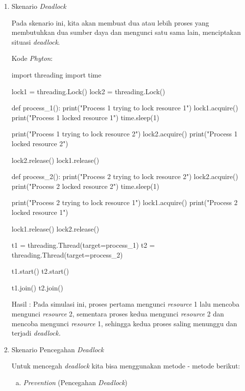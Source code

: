 \documentclass[12pt]{article}
\begin{document}
\begin{enumerate}
    \item Skenario \textit{Deadlock}

    Pada skenario ini, kita akan membuat dua atau lebih proses yang membutuhkan dua sumber daya dan mengunci satu sama lain, menciptakan situasi \textit{deadlock}.


    Kode \textit{Phyton}:

    \begin{python}
import threading
import time

lock1 = threading.Lock()
lock2 = threading.Lock()

def process_1():
    print("Process 1 trying to lock resource 1")
    lock1.acquire()
    print("Process 1 locked resource 1")
    time.sleep(1)
    
    print("Process 1 trying to lock resource 2")
    lock2.acquire()
    print("Process 1 locked resource 2")
    
    lock2.release()
    lock1.release()

def process_2():
    print("Process 2 trying to lock resource 2")
    lock2.acquire()
    print("Process 2 locked resource 2")
    time.sleep(1)
    
    print("Process 2 trying to lock resource 1")
    lock1.acquire()
    print("Process 2 locked resource 1")
    
    lock1.release()
    lock2.release()

t1 = threading.Thread(target=process_1)
t2 = threading.Thread(target=process_2)

t1.start()
t2.start()

t1.join()
t2.join()

    \end{python}

    Hasil : Pada simulasi ini, proses pertama mengunci \textit{resource} 1 lalu mencoba mengunci \textit{resource} 2, sementara proses kedua mengunci \textit{resource} 2 dan mencoba mengunci \textit{resource} 1, sehingga kedua proses saling menunggu dan terjadi \textit{deadlock.}

    \item Skenario Pencegahan \textit{Deadlock}

    Untuk mencegah \textit{deadlock} kita bisa menggunakan metode - metode berikut:

    \begin{enumerate}[a.]
        \item \textit{Prevention} (Pencegahan \textit{Deadlock})


\end{enumerate}
\end{enumerate}
\end{document}
